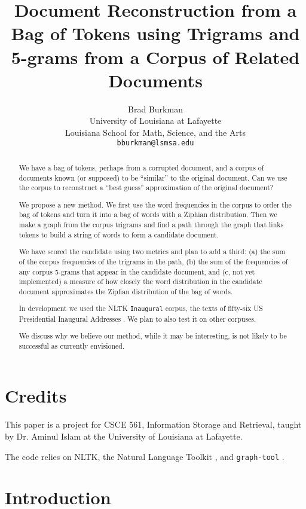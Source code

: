 \documentclass[11pt]{article}
\title{Document Reconstruction from a Bag of Tokens using Trigrams and 5-grams from a Corpus of Related Documents}
\author{Brad Burkman \\
  University of Louisiana at Lafayette \\
  Louisiana School for Math, Science, and the Arts \\
  {\tt bburkman@lsmsa.edu} 
 }
\begin{document}
\maketitle

\begin{abstract}
	We have a bag of tokens, perhaps from a corrupted document, and a corpus of documents known (or supposed) to be ``similar'' to the original document.  Can we use the corpus to reconstruct a ``best guess'' approximation of the original document?
	
	We propose a new method.  We first use the word frequencies in the corpus to order the bag of tokens and turn it into a bag of words with a Ziphian distribution.  Then we make a graph from the corpus trigrams and find a path through the graph that links tokens to build a string of words to form a candidate document.  
	
	We have scored the candidate using two metrics and plan to add a third:  (a) the sum of the corpus frequencies of the trigrams in the path, (b) the sum of the frequencies of any corpus 5-grams that appear in the candidate document, and (c, not yet implemented) a measure of how closely the word distribution in the candidate document approximates the Zipfian distribution of the bag of words.
	
	In development we used the NLTK {\tt Inaugural} corpus, the texts of fifty-six US Presidential Inaugural Addresses \cite{Bird:09}.  We plan to also test it on other corpuses.   
	
	We discuss why we believe our method, while it may be interesting, is not likely to be successful as currently envisioned.  
	
\end{abstract}

\section{Credits}

This paper is a project for CSCE 561, Information Storage and Retrieval, taught by Dr. Aminul Islam at the University of Louisiana at Lafayette.  

The code relies on NLTK, the Natural Language Toolkit \cite{Bird:09}, and \verb|graph-tool| \cite{peixoto_graph-tool_2014}.

\section{Introduction}
\end{document}
